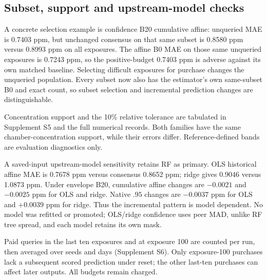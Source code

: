 \subsection{Subset, support and upstream-model checks}
A concrete selection example is confidence B20 cumulative affine: unqueried MAE is 0.7403 ppm, but unchanged consensus on that same subset is 0.8580 ppm versus 0.8993 ppm on all exposures. The affine B0 MAE on those same unqueried exposures is 0.7243 ppm, so the positive-budget 0.7403 ppm is adverse against its own matched baseline. Selecting difficult exposures for purchase changes the unqueried population. Every subset now also has the estimator's own same-subset B0 and exact count, so subset selection and incremental prediction changes are distinguishable.

Concentration support and the 10\% relative tolerance are tabulated in Supplement S5 and the full numerical records. Both families have the same chamber-concentration support, while their errors differ. Reference-defined bands are evaluation diagnostics only.

A saved-input upstream-model sensitivity retains RF as primary. OLS historical affine MAE is 0.7678 ppm versus consensus 0.8652 ppm; ridge gives 0.9046 versus 1.0873 ppm. Under envelope B20, cumulative affine changes are $-0.0021$ and $-0.0025$ ppm for OLS and ridge. Native $.95$ changes are $-0.0037$ ppm for OLS and $+0.0039$ ppm for ridge. Thus the incremental pattern is model dependent. No model was refitted or promoted; OLS/ridge confidence uses peer MAD, unlike RF tree spread, and each model retains its own mask.

Paid queries in the last ten exposures and at exposure 100 are counted per run, then averaged over seeds and days (Supplement S6). Only exposure-100 purchases lack a subsequent scored prediction under reset; the other last-ten purchases can affect later outputs. All budgets remain charged.

